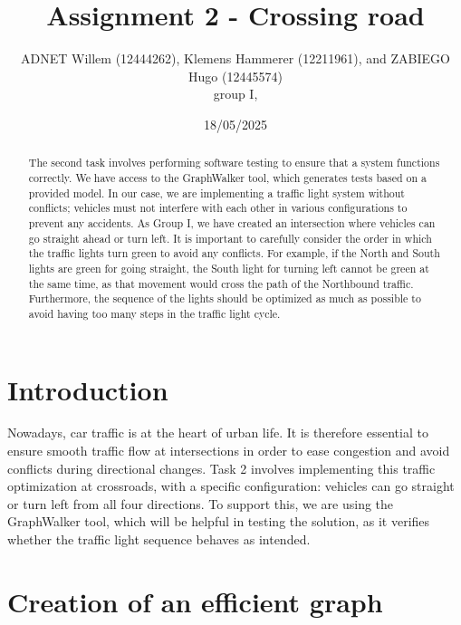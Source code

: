 \documentclass[twocolumn,10pt]{article}
\begin{document}
\title{Assignment 2 - Crossing road}
\author{ADNET Willem (12444262), Klemens Hammerer (12211961), and ZABIEGO Hugo (12445574) \\
group I, 
}

\date{18/05/2025}




\maketitle

\begin{abstract}

The second task involves performing software testing to ensure that a system functions correctly. We have access to the GraphWalker tool, which generates tests based on a provided model. In our case, we are implementing a traffic light system without conflicts; vehicles must not interfere with each other in various configurations to prevent any accidents. As Group I, we have created an intersection where vehicles can go straight ahead or turn left. It is important to carefully consider the order in which the traffic lights turn green to avoid any conflicts. For example, if the North and South lights are green for going straight, the South light for turning left cannot be green at the same time, as that movement would cross the path of the Northbound traffic. Furthermore, the sequence of the lights should be optimized as much as possible to avoid having too many steps in the traffic light cycle.

\end{abstract}

\section{Introduction}

Nowadays, car traffic is at the heart of urban life. It is therefore essential to ensure smooth traffic flow at intersections in order to ease congestion and avoid conflicts during directional changes. Task 2 involves implementing this traffic optimization at crossroads, with a specific configuration: vehicles can go straight or turn left from all four directions. To support this, we are using the GraphWalker tool, which will be helpful in testing the solution, as it verifies whether the traffic light sequence behaves as intended.

\section{Creation of an efficient graph}
\end{document}
